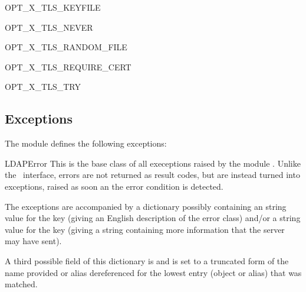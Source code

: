 \begin{datadesc}{OPT_X_TLS_KEYFILE}
\end{datadesc}

\begin{datadesc}{OPT_X_TLS_NEVER}
\end{datadesc}

\begin{datadesc}{OPT_X_TLS_RANDOM_FILE}
\end{datadesc}

\begin{datadesc}{OPT_X_TLS_REQUIRE_CERT}
\end{datadesc}

\begin{datadesc}{OPT_X_TLS_TRY}
\end{datadesc}



\subsection{Exceptions}
\label{subsec:exceptfrommeth}

The module defines the following exceptions:

\begin{excdesc}{LDAPError}
This is the base class of all execeptions raised by the module .
Unlike the \C\ interface, errors are not returned as result codes, but
are instead turned into exceptions, raised as soon an the error condition 
is detected.

The exceptions are accompanied by a dictionary possibly
containing an string value for the key  
(giving an English description of the error class)
and/or a string value for the key 
(giving a string containing more information that the server may have sent).

A third possible field of this dictionary is  and
is set to a truncated form of the name provided or alias dereferenced
for the lowest entry (object or alias) that was matched.

\end{excdesc}


